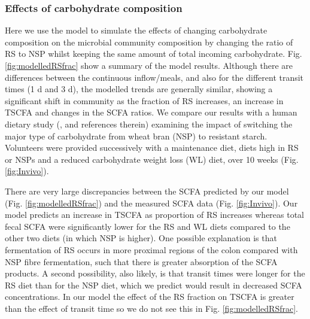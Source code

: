 \documentclass[a4paper]{article}
\begin{document}
\subsubsection*{Effects of carbohydrate composition}
Here we use the model to simulate the effects of changing carbohydrate composition on the microbial community composition by changing the ratio of RS to NSP whilst keeping the same amount of total incoming carbohydrate.
Fig. \ref{fig:modelledRSfrac} show a summary of the model results. Although there are differences between the continuous inflow/meals, and also for the different transit times (1 d and 3 d), the modelled trends are generally similar, showing a significant shift in community as the fraction of RS increases, an increase in TSCFA and changes in the SCFA ratios. 
We compare our results with a human dietary study (\cite{walker2011}, \cite{salonen} and references therein) examining the impact of switching the major type of carbohydrate from wheat bran (NSP) to resistant starch.
Volunteers were provided successively with a maintenance diet, diets high in RS or NSPs and a reduced carbohydrate weight loss (WL) diet, over 10 weeks (Fig. \ref{fig:Invivo}).




There are very large discrepancies between the SCFA predicted by our model (Fig. \ref{fig:modelledRSfrac}) and the measured SCFA data (Fig. \ref{fig:Invivo}). 
Our model predicts an increase in TSCFA as proportion of RS increases whereas total fecal SCFA were significantly lower for the RS and WL diets compared to the other two diets (in which NSP is higher). 
One possible explanation is that fermentation of RS occurs in more proximal regions of the colon compared with NSP fibre fermentation, such that there is greater absorption of the SCFA products.
A second possibility, also likely, is that transit times were longer for the RS diet than for the NSP diet, which we predict would result in decreased SCFA concentrations.%
In our model the effect of the RS fraction on TSCFA is greater than the effect of transit time so we do not see this in Fig. \ref{fig:modelledRSfrac}.
\end{document}
